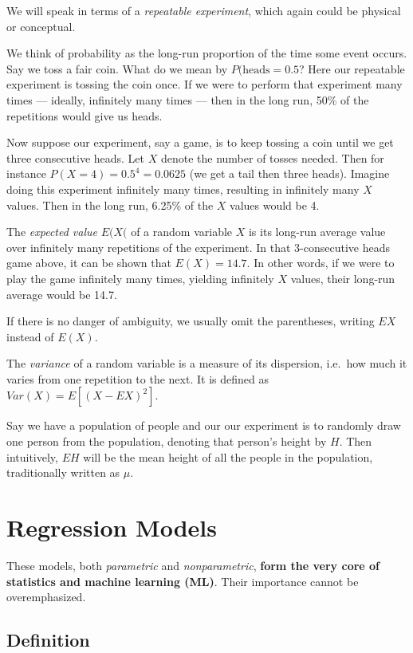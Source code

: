 We will speak in terms of a \textit{repeatable experiment}, which again
could be physical or conceptual.

We think of probability as the long-run proportion of the time some
event occurs.  Say we toss a fair coin.  What do we mean by
$P(\textrm{heads} = 0.5$?  Here our repeatable experiment is tossing the
coin once.  If we were to perform that experiment many times ---
ideally, infinitely many times --- then in the long run, 50\% of the
repetitions would give us heads.

Now suppose our experiment, say a game, is to keep tossing a coin until
we get three consecutive heads.  Let $X$ denote the number of tosses
needed.  Then for instance $P(X = 4) = 0.5^4 = 0.0625$ (we get a tail
then three heads).  Imagine doing this experiment infinitely many times,
resulting in infinitely many $X$ values.  Then in the long run, 6.25\%
of the $X$ values would be 4.

The \textit{expected value} $E(X($ of a random variable $X$ is its long-run
average value over infinitely many repetitions of the experiment.  In
that 3-consecutive heads game above, it can be shown that $E(X) = 14.7$.
In other words, if we were to play the game infinitely many times,
yielding infinitely $X$ values, their long-run average would be 14.7.

If there is no danger of ambiguity, we usually omit the parentheses,
writing $EX$ instead of $E(X)$.

The \textit{variance} of a random variable is a measure of its
dispersion, i.e.\ how much it varies from one repetition to the next.
It is defined as $Var(X) = E[(X - EX)^2]$.

Say we have a population of people and our our experiment is to 
randomly draw one person from the population, denoting that person's
height by $H$.  Then intuitively, $EH$ will be the mean height of all
the people in the population, traditionally written as $\mu$.

\section{Regression Models} 

These models, both \textit{parametric} and \textit{nonparametric},
\textbf{form the very core of statistics and machine learning (ML)}.  Their
importance cannot be overemphasized.

\subsection{Definition}

